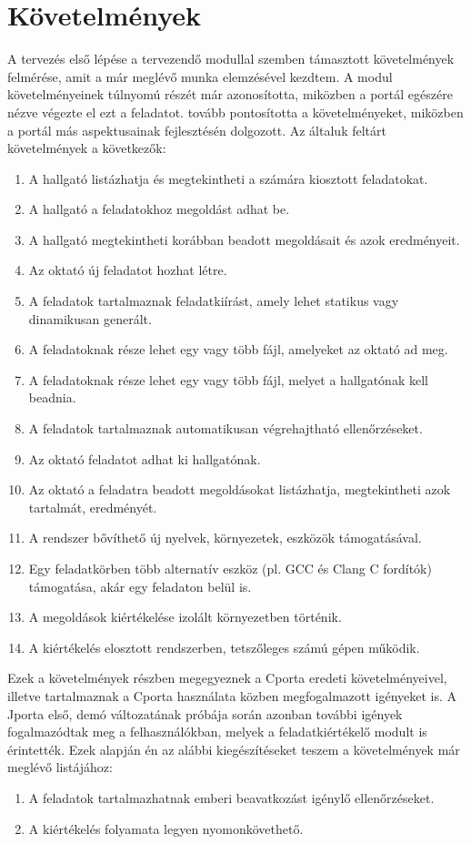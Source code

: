 \section{Követelmények}
A tervezés első lépése a tervezendő modullal szemben támasztott követelmények felmérése, amit a már meglévő munka elemzésével kezdtem.
A modul követelményeinek túlnyomú részét \cite{Ory13} már azonosította, miközben a portál egészére nézve végezte el ezt a feladatot.
\cite{Kalman14} tovább pontosította a követelményeket, miközben a portál más aspektusainak fejlesztésén dolgozott.
Az általuk feltárt követelmények a következők:
\begin{enumerate}
    \item A hallgató listázhatja és megtekintheti a számára kiosztott feladatokat.
    \item A hallgató a feladatokhoz megoldást adhat be.
    \item A hallgató megtekintheti korábban beadott megoldásait és azok eredményeit.
    \item Az oktató új feladatot hozhat létre.
    \item \label{item:specification} A feladatok tartalmaznak feladatkiírást, amely lehet statikus vagy dinamikusan generált.
    \item A feladatoknak része lehet egy vagy több fájl, amelyeket az oktató ad meg.
    \item A feladatoknak része lehet egy vagy több fájl, melyet a hallgatónak kell beadnia.
    \item A feladatok tartalmaznak automatikusan végrehajtható ellenőrzéseket.
    \item Az oktató feladatot adhat ki hallgatónak.
    \item Az oktató a feladatra beadott megoldásokat listázhatja, megtekintheti azok tartalmát, eredményét.
    \item A rendszer bővíthető új nyelvek, környezetek, eszközök támogatásával.
    \item Egy feladatkörben több alternatív eszköz (pl. GCC és Clang C fordítók) támogatása, akár egy feladaton belül is.
    \item \label{item:isolation} A megoldások kiértékelése izolált környezetben történik.
    \item A kiértékelés elosztott rendszerben, tetszőleges számú gépen működik.
\end{enumerate}
Ezek a követelmények részben megegyeznek a Cporta eredeti követelményeivel, illetve tartalmaznak a Cporta használata közben megfogalmazott igényeket is.
A Jporta első, demó változatának próbája során azonban további igények fogalmazódtak meg a felhasználókban, melyek a feladatkiértékelő modult is érintették.
Ezek alapján én az alábbi kiegészítéseket teszem a követelmények már meglévő listájához:
\begin{enumerate}[resume]
    \item \label{item:manual} A feladatok tartalmazhatnak emberi beavatkozást igénylő ellenőrzéseket.
    \item \label{item:traceability} A kiértékelés folyamata legyen nyomonkövethető.
\end{enumerate}

